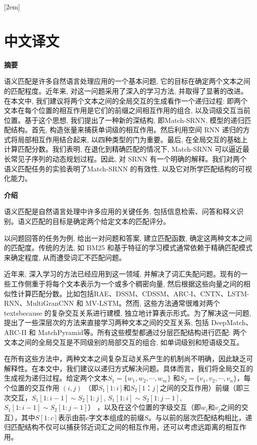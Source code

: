 
[2em]{\vspace{.5\baselineskip}\xiaosan\song}
             {\prechaptername\CJKnumber{\thecontentslabel}\postchaptername\qquad}{}
             {}             %
\setcounter{page}{1}            %
\chapter*{中文译文}
\pagestyle{fancy}
\textbf{摘要}

语义匹配是许多自然语言处理应用的一个基本问题, 它的目标在确定两个文本之间的匹配程度。近年来, 对这一问题采用了深入的学习方法, 并取得了显著的改进。在本文中, 我们建议将两个文本之间的全局交互的生成看作一个递归过程: 即两个文本在每个位置的相互作用是它们的前缀之间相互作用的组合, 以及词级交互当前位置。基于这个思想, 我们提出了一种新的深结构, 即Match-SRNN, 模型的递归匹配结构。首先, 构造张量来捕获单词级的相互作用。然后利用空间 RNN 递归的方式将局部相互作用结合起来, 以四种类型的门为重要。最后, 在全局交互的基础上计算匹配分数。我们表明, 在退化到精确匹配的情况下, Match-SRNN 可以逼近最长常见子序列的动态规划过程。因此, 对 SRNN 有一个明确的解释。我们对两个语义匹配任务的实验表明了Match-SRNN 的有效性, 以及它对所学匹配结构的可视化能力。

\textbf{介绍}

语义匹配是自然语言处理中许多应用的关键任务, 包括信息检索、问答和释义识别。语义匹配的目标是确定两个给定文本的匹配评分。

以问题回答的任务为例, 给出一对问题和答案, 建立匹配函数, 确定这两种文本之间的匹配度。传统的方法, 如 BM25 和基于特征的学习模式通常依赖于精确匹配模式来确定程度, 从而遭受词汇不匹配问题。

近年来, 深入学习的方法已经应用到这一领域, 并解决了词汇失配问题。现有的一些工作侧重于将每个文本表示为一个或多个稠密向量, 然后根据这些向量之间的相似性计算匹配分数。比如包括RAE、DSSM、CDSSM、ARC-I、CNTN、LSTM-RNN、MultiGranCNN 和 MV-LSTM。然而, 这些方法通常很难对两个 textsbecause 的复杂交互关系进行建模, 独立地计算表示形式。为了解决这一问题, 提出了一些深层次的方法来直接学习两种文本之间的交互关系, 包括 DeepMatch、ARC-II 和 MatchPyramid等。所有这些模型都通过分层匹配结构进行匹配: 两个文本之间的全局交互是不同级别的局部交互的组合, 如单词级别和短语级交互。

在所有这些方法中，两种文本之间复杂互动关系产生的机制尚不明确，因此缺乏可解释性。在本文中，我们建议以递归方式解决问题。具体而言，我们将全局交互的生成视为递归过程。给定两个文本$S_1\!\!=\!\!\{w_1,w_2,\cdots,w_m\}$ 和$S_2\!\!=\!\!\{v_1,v_2,\cdots,v_n\}$，每个位置的交互作用 $(i,j)$ （即$S_1[1{:}i]$和$ S_2 [1 {：} j] $之间的交互作用）前缀（即三次交互，$S_1[1{:}i{-}1]\!{\sim}\! S_2[1{:}j]$, $S_1[1{:}i]\!{\sim}\! S_2[1{:}j{-}1]$, $S_1[1{:}i{-}1]{\sim} S_2[1{:}j{-}1]$） ，以及在这个位置的字级交互（即$ w_i $和$ v_j $之间的交互），其中$S[1{:}c]$表示由前$ c $字文本组成的前缀$S$。与以前的层次匹配结构相比，递归匹配结构不仅可以捕获邻近词汇之间的相互作用，还可以考虑远距离的相互作用。

